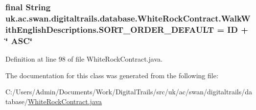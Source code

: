 \hypertarget{classuk_1_1ac_1_1swan_1_1digitaltrails_1_1database_1_1_white_rock_contract_1_1_walk_with_english_descriptions_adc10b6bf378c040f418a9803a7afc853}{
\subsubsection[{S\+O\+R\+T\+\_\+\+O\+R\+D\+E\+R\+\_\+\+D\+E\+F\+A\+U\+L\+T}]{\setlength{\rightskip}{0pt plus 5cm}final String uk.\+ac.\+swan.\+digitaltrails.\+database.\+White\+Rock\+Contract.\+Walk\+With\+English\+Descriptions.\+S\+O\+R\+T\+\_\+\+O\+R\+D\+E\+R\+\_\+\+D\+E\+F\+A\+U\+L\+T = I\+D + \char`\"{} A\+S\+C\char`\"{}\hspace{0.3cm}{\ttfamily [static]}}}\label{classuk_1_1ac_1_1swan_1_1digitaltrails_1_1database_1_1_white_rock_contract_1_1_walk_with_english_descriptions_adc10b6bf378c040f418a9803a7afc853}


Definition at line 98 of file White\+Rock\+Contract.\+java.



The documentation for this class was generated from the following file\+:\begin{DoxyCompactItemize}
\item 
C\+:/\+Users/\+Admin/\+Documents/\+Work/\+Digital\+Trails/src/uk/ac/swan/digitaltrails/database/\hyperlink{_white_rock_contract_8java}{White\+Rock\+Contract.\+java}\end{DoxyCompactItemize}
